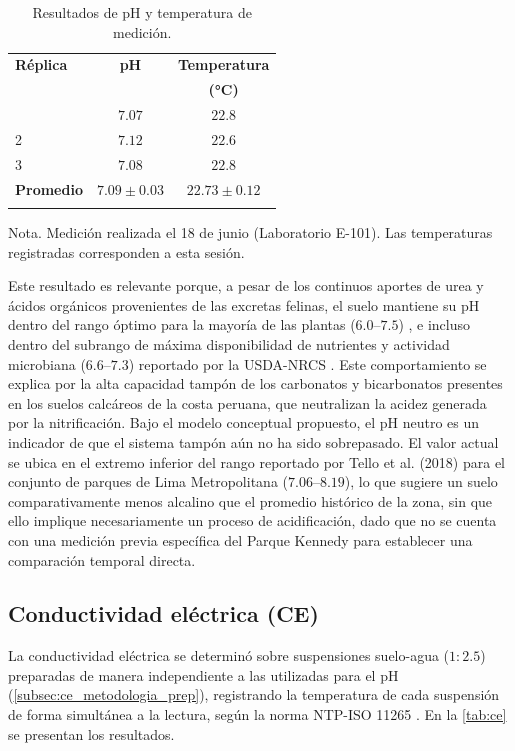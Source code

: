 \documentclass[fleqn]{jaes}
\begin{document}
\begin{table}[!ht]
\centering
\small
\caption{Resultados de pH y temperatura de medición.}\label{tab:ph}
\begin{tabular}{@{}lcc@{}}
\toprule
\textbf{Réplica} & \textbf{pH} & \textbf{Temperatura} \\
 & & \textbf{(°C)} \\
\colrule
1 & $7.07$ & $22.8$ \\
2 & $7.12$ & $22.6$ \\
3 & $7.08$ & $22.8$ \\
\colrule
\textbf{Promedio} & $7.09 \pm 0.03$ & $22.73 \pm 0.12$ \\
\botrule
\end{tabular}
\begin{tabnote}
Nota. Medición realizada el 18 de junio (Laboratorio E-101). Las temperaturas registradas corresponden a esta sesión.
\end{tabnote}
\end{table} Este resultado es relevante porque, a pesar de los continuos aportes de urea y ácidos orgánicos provenientes de las excretas felinas, el suelo mantiene su pH dentro del rango óptimo para la mayoría de las plantas ($6.0$--$7.5$) \cite{PortaCasanellas1994}, e incluso dentro del subrango de máxima disponibilidad de nutrientes y actividad microbiana ($6.6$--$7.3$) reportado por la USDA-NRCS \cite{USDANRCS1998}. Este comportamiento se explica por la alta capacidad tampón de los carbonatos y bicarbonatos presentes en los suelos calcáreos de la costa peruana, que neutralizan la acidez generada por la nitrificación. Bajo el modelo conceptual propuesto, el pH neutro es un indicador de que el sistema tampón aún no ha sido sobrepasado. El valor actual se ubica en el extremo inferior del rango reportado por Tello et al. (2018) para el conjunto de parques de Lima Metropolitana ($7.06$--$8.19$), lo que sugiere un suelo comparativamente menos alcalino que el promedio histórico de la zona, sin que ello implique necesariamente un proceso de acidificación, dado que no se cuenta con una medición previa específica del Parque Kennedy para establecer una comparación temporal directa.

\subsection{Conductividad eléctrica (CE)}

La conductividad eléctrica se determinó sobre suspensiones suelo-agua ($1:2.5$) preparadas de manera independiente a las utilizadas para el pH (\cref{subsec:ce_metodologia_prep}), registrando la temperatura de cada suspensión de forma simultánea a la lectura, según la norma NTP-ISO 11265 \cite{INACAL2018}. En la \cref{tab:ce} se presentan los resultados.
\end{document}
